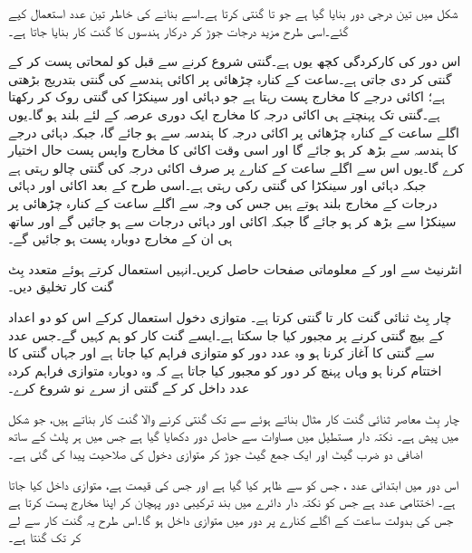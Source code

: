 شکل   میں تین درجی دور بنایا گیا ہے جو  تا  گنتی کرتا ہے۔اسے بنانے کی خاطر تین عدد   استعمال کیے گئے۔اسی طرح مزید درجات جوڑ کر درکار ہندسوں کا  گنت کار بنایا جاتا ہے۔ 


اس دور کی کارکردگی کچھ یوں ہے۔گنتی شروع کرنے سے قبل   کو  لمحاتی  پست کر کے گنتی  کر دی جاتی ہے۔ساعت کے کنارہ چڑھائی پر اکائی  ہندسے کی گنتی بتدریج  بڑھتی ہے؛ اکائی درجے کا مخارج   پست رہتا ہے  جو  دہائی اور سینکڑا کی گنتی  روک کر  رکھتا ہے۔گنتی   تک پہنچتے ہی اکائی درجہ  کا مخارج  ایک دوری عرصہ کے لئے   بلند ہو گا۔یوں اگلے ساعت کے کنارہ چڑھائی  پر اکائی درجہ کا ہندسہ سے   ہو جائے گا، جبکہ دہائی درجے کا ہندسہ  سے بڑھ کر  ہو جائے  گا  اور اسی وقت اکائی کا مخارج    واپس پست  حال اختیار کرے گا۔یوں اس سے اگلے ساعت کے کنارے پر صرف اکائی درجہ کی گنتی چالو رہتی ہے جبکہ دہائی اور سینکڑا کی گنتی  رکی رہتی ہے۔اسی طرح   کے بعد اکائی اور دہائی درجات کے مخارج   بلند ہوتے ہیں جس کی وجہ سے اگلے ساعت کے کنارہ   چڑھائی پر سینکڑا   سے بڑھ کر  ہو جائے گا جبکہ اکائی اور دہائی درجات   سے  ہو جائیں گے اور ساتھ ہی ان کے مخارج    دوبارہ پست ہو جائیں گے۔

انٹرنیٹ سے  اور  کے معلوماتی صفحات حاصل کریں۔انہیں استعمال کرتے ہوئے   متعدد بِٹ گنت کار  تخلیق دیں۔


چار بِٹ ثنائی گنت کار   تا   گنتی کرتا ہے۔ متوازی دخول  استعمال کرکے    اس کو دو اعداد کے  بیچ گنتی کرنے پر مجبور کیا جا سکتا ہے۔ایسے گنت کار کو ہم  کہیں گے۔جس عدد سے   گنتی کا آغاز  کرنا ہو وہ  عدد دور کو  متوازی فراہم کیا جاتا ہے اور جہاں   گنتی کا اختتام کرنا ہو وہاں پہنچ کر  دور کو مجبور کیا جاتا ہے کہ وہ دوبارہ متوازی فراہم کردہ عدد داخل کر کے گنتی از سرے نو شروع کرے۔

چار بِٹ معاصر ثنائی گنت کار  مثال بناتے ہوئے   سے  تک  گنتی کرنے والا گنت کار بناتے ہیں،  جو شکل میں  پیش ہے۔  نکتہ دار مستطیل میں مساوات   سے حاصل دور دکھایا گیا ہے  جس میں ہر پلٹ کے ساتھ   اضافی دو ضرب گیٹ اور ایک جمع گیٹ جوڑ کر متوازی دخول کی صلاحیت پیدا کی گئی ہے۔

اس دور میں ابتدائی عدد  ، جس کو  سے ظاہر کیا گیا ہے اور جس کی قیمت  ہے، متوازی داخل کیا جاتا ہے۔ اختتامی  عدد  ہے  جس کو  نکتہ دار دائرے میں بند ترکیبی دور پہچان کر اپنا مخارج پست کرتا ہے  جس کی بدولت  ساعت کے اگلے کنارے پر    دور میں  متوازی داخل ہو  گا۔اس طرح یہ  گنت کار  سے لے کر   تک گنتا ہے۔

